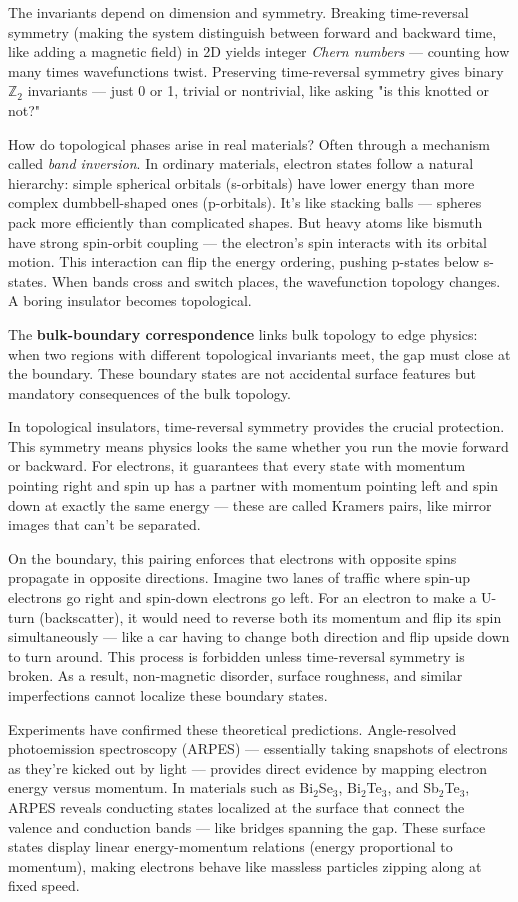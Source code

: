 The invariants depend on dimension and symmetry. Breaking time-reversal symmetry (making the system distinguish between forward and backward time, like adding a magnetic field) in 2D yields integer \emph{Chern numbers} — counting how many times wavefunctions twist. Preserving time-reversal symmetry gives binary \(\mathbb{Z}_2\) invariants — just 0 or 1, trivial or nontrivial, like asking "is this knotted or not?"

How do topological phases arise in real materials? Often through a mechanism called \emph{band inversion}. In ordinary materials, electron states follow a natural hierarchy: simple spherical orbitals (s-orbitals) have lower energy than more complex dumbbell-shaped ones (p-orbitals). It's like stacking balls — spheres pack more efficiently than complicated shapes. But heavy atoms like bismuth have strong spin-orbit coupling — the electron's spin interacts with its orbital motion. This interaction can flip the energy ordering, pushing p-states below s-states. When bands cross and switch places, the wavefunction topology changes. A boring insulator becomes topological.

The \textbf{bulk-boundary correspondence} links bulk topology to edge physics: when two regions with different topological invariants meet, the gap must close at the boundary. These boundary states are not accidental surface features but mandatory consequences of the bulk topology.

In topological insulators, time-reversal symmetry provides the crucial protection. This symmetry means physics looks the same whether you run the movie forward or backward. For electrons, it guarantees that every state with momentum pointing right and spin up has a partner with momentum pointing left and spin down at exactly the same energy — these are called Kramers pairs, like mirror images that can't be separated.

On the boundary, this pairing enforces that electrons with opposite spins propagate in opposite directions. Imagine two lanes of traffic where spin-up electrons go right and spin-down electrons go left. For an electron to make a U-turn (backscatter), it would need to reverse both its momentum and flip its spin simultaneously — like a car having to change both direction and flip upside down to turn around. This process is forbidden unless time-reversal symmetry is broken. As a result, non-magnetic disorder, surface roughness, and similar imperfections cannot localize these boundary states. 

Experiments have confirmed these theoretical predictions. Angle-resolved photoemission spectroscopy (ARPES) — essentially taking snapshots of electrons as they're kicked out by light — provides direct evidence by mapping electron energy versus momentum. In materials such as Bi\(_2\)Se\(_3\), Bi\(_2\)Te\(_3\), and Sb\(_2\)Te\(_3\), ARPES reveals conducting states localized at the surface that connect the valence and conduction bands — like bridges spanning the gap. These surface states display linear energy-momentum relations (energy proportional to momentum), making electrons behave like massless particles zipping along at fixed speed.

